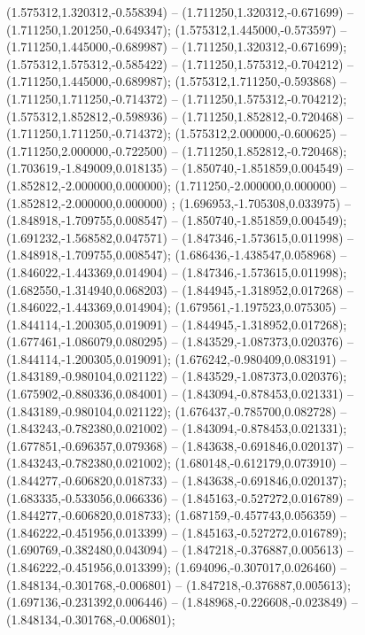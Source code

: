  (1.575312,1.320312,-0.558394) -- (1.711250,1.320312,-0.671699) -- (1.711250,1.201250,-0.649347);
 (1.575312,1.445000,-0.573597) -- (1.711250,1.445000,-0.689987) -- (1.711250,1.320312,-0.671699);
 (1.575312,1.575312,-0.585422) -- (1.711250,1.575312,-0.704212) -- (1.711250,1.445000,-0.689987);
 (1.575312,1.711250,-0.593868) -- (1.711250,1.711250,-0.714372) -- (1.711250,1.575312,-0.704212);
 (1.575312,1.852812,-0.598936) -- (1.711250,1.852812,-0.720468) -- (1.711250,1.711250,-0.714372);
 (1.575312,2.000000,-0.600625) -- (1.711250,2.000000,-0.722500) -- (1.711250,1.852812,-0.720468);
 (1.703619,-1.849009,0.018135) -- (1.850740,-1.851859,0.004549) -- (1.852812,-2.000000,0.000000);
 (1.711250,-2.000000,0.000000) -- (1.852812,-2.000000,0.000000) ;
 (1.696953,-1.705308,0.033975) -- (1.848918,-1.709755,0.008547) -- (1.850740,-1.851859,0.004549);
 (1.691232,-1.568582,0.047571) -- (1.847346,-1.573615,0.011998) -- (1.848918,-1.709755,0.008547);
 (1.686436,-1.438547,0.058968) -- (1.846022,-1.443369,0.014904) -- (1.847346,-1.573615,0.011998);
 (1.682550,-1.314940,0.068203) -- (1.844945,-1.318952,0.017268) -- (1.846022,-1.443369,0.014904);
 (1.679561,-1.197523,0.075305) -- (1.844114,-1.200305,0.019091) -- (1.844945,-1.318952,0.017268);
 (1.677461,-1.086079,0.080295) -- (1.843529,-1.087373,0.020376) -- (1.844114,-1.200305,0.019091);
 (1.676242,-0.980409,0.083191) -- (1.843189,-0.980104,0.021122) -- (1.843529,-1.087373,0.020376);
 (1.675902,-0.880336,0.084001) -- (1.843094,-0.878453,0.021331) -- (1.843189,-0.980104,0.021122);
 (1.676437,-0.785700,0.082728) -- (1.843243,-0.782380,0.021002) -- (1.843094,-0.878453,0.021331);
 (1.677851,-0.696357,0.079368) -- (1.843638,-0.691846,0.020137) -- (1.843243,-0.782380,0.021002);
 (1.680148,-0.612179,0.073910) -- (1.844277,-0.606820,0.018733) -- (1.843638,-0.691846,0.020137);
 (1.683335,-0.533056,0.066336) -- (1.845163,-0.527272,0.016789) -- (1.844277,-0.606820,0.018733);
 (1.687159,-0.457743,0.056359) -- (1.846222,-0.451956,0.013399) -- (1.845163,-0.527272,0.016789);
 (1.690769,-0.382480,0.043094) -- (1.847218,-0.376887,0.005613) -- (1.846222,-0.451956,0.013399);
 (1.694096,-0.307017,0.026460) -- (1.848134,-0.301768,-0.006801) -- (1.847218,-0.376887,0.005613);
 (1.697136,-0.231392,0.006446) -- (1.848968,-0.226608,-0.023849) -- (1.848134,-0.301768,-0.006801);
